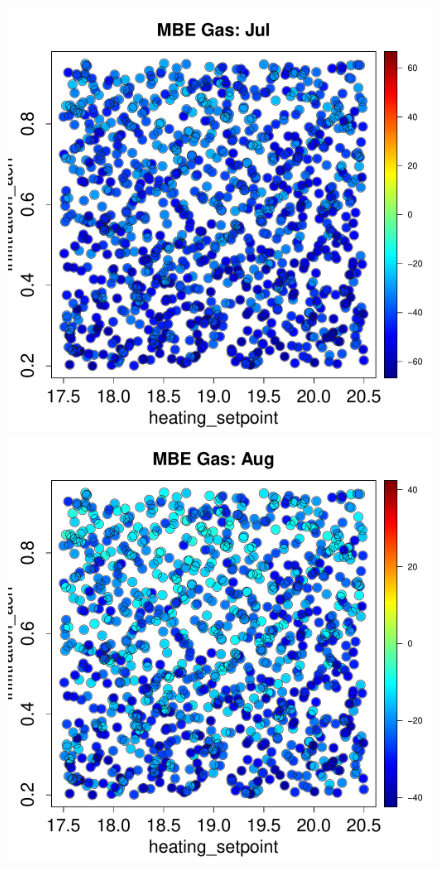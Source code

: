 \documentclass[a4paper, 12pt]{article}
\begin{document}
\begin{figure}
 \includegraphics[width=\scale]{MBE/MBE_Gas_07.pdf}
 \includegraphics[width=\scale]{MBE/MBE_Gas_08.pdf}

\end{figure}
\end{document}
